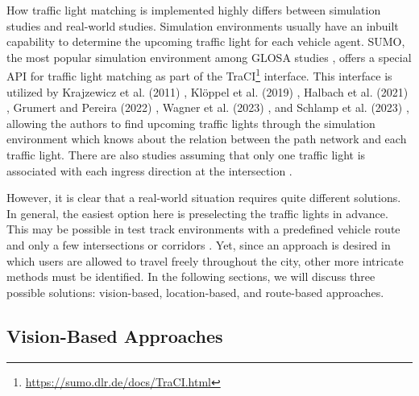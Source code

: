 How traffic light matching is implemented highly differs between simulation studies and real-world studies. Simulation environments usually have an inbuilt capability to determine the upcoming traffic light for each vehicle agent. SUMO, the most popular simulation environment among GLOSA studies \cite{krajzewicz_preparing_2012, erdmann_combining_2013, eckhoff_potentials_2013, tal_vehicular-communications-based_2016, nguyen_efficient_2016, olaverri-monreal_implementation_2018, karoui_efficiency_2018, pariota_green_2019, kloeppel_performance_2019, lu_green_2020, halbach_cooperative_2021, bhattacharyya_assessing_2022, grumert_heads-up_2022, wagner_spatmap_2023}, offers a special API for traffic light matching as part of the TraCI\footnote{\url{https://sumo.dlr.de/docs/TraCI.html}} interface. This interface is utilized by Krajzewicz et al. (2011) \cite{krajzewicz_preparing_2012}, Klöppel et al. (2019) \cite{kloeppel_performance_2019}, Halbach et al. (2021) \cite{halbach_cooperative_2021}, Grumert and Pereira (2022) \cite{grumert_heads-up_2022}, Wagner et al. (2023) \cite{wagner_spatmap_2023}, and Schlamp et al. (2023) \cite{schlamp_2023_glosa}, allowing the authors to find upcoming traffic lights through the simulation environment which knows about the relation between the path network and each traffic light. There are also studies assuming that only one traffic light is associated with each ingress direction at the intersection \cite{xia_indirect_2011, li_multi-vehicles_2014, plianos_predictive_2018}.

However, it is clear that a real-world situation requires quite different solutions. In general, the easiest option here is preselecting the traffic lights in advance. This may be possible in test track environments with a predefined vehicle route and only a few intersections \cite{chen_developing_2022} or corridors \cite{fickas_fast_2019}. Yet, since an approach is desired in which users are allowed to travel freely throughout the city, other more intricate methods must be identified. In the following sections, we will discuss three possible solutions: vision-based, location-based, and route-based approaches.

\subsection{Vision-Based Approaches}


